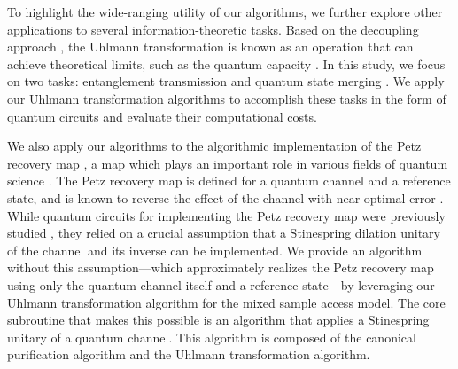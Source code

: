 To highlight the wide-ranging utility of our algorithms, we further explore other applications to several information-theoretic tasks. 
Based on the decoupling approach \cite{hayden2008decoupling, dupuis2010decoupling, Szehr2013decouple2design, dupuis2014one, preskill2016quantumshannon}, the Uhlmann transformation is known as an operation that can achieve theoretical limits, such as the quantum capacity \cite{hayden2008decoupling}.
In this study, we focus on two tasks: entanglement transmission \cite{Schumacher1996sendingentanglement, schumacher2001approximateerrorcorrection, hayden2007black, datta2013oneshotentassistQCcom, beigi2016decoding, khatri2024principlemodern} and quantum state merging \cite{Horodecki2005Partialquantinfo, berta2008singleshot, dupuis2014one, yamasaki2019statemergesmalldimension}.
We apply our Uhlmann transformation algorithms to accomplish these tasks in the form of quantum circuits and evaluate their computational costs.


We also apply our algorithms to the algorithmic implementation of the Petz recovery map \cite{petz1986sufficient, petz1988sufficiency}, a map which plays an important role in various fields of quantum science \cite{barnum2002reversing, ng2010simpleapproach, chen2020entanglement, lauten2022approx, gilyen2022petzmap, biswas2023noiseadapted, nakayama2023petz}.
The Petz recovery map is defined for a quantum channel and a reference state, and is known to reverse the effect of the channel with near-optimal error \cite{barnum2002reversing, beigi2016decoding}.
While quantum circuits for implementing the Petz recovery map were previously studied \cite{gilyen2022petzmap, biswas2023noiseadapted}, they relied on a crucial assumption that a Stinespring dilation unitary \cite{stinespring1955} of the channel and its inverse can be implemented. 
We provide an algorithm without this assumption---which approximately realizes the Petz recovery map using only the quantum channel itself and a reference state---by leveraging our Uhlmann transformation algorithm for the mixed sample access model.
The core subroutine that makes this possible is an algorithm that applies a Stinespring unitary of a quantum channel.
This algorithm is composed of the canonical purification algorithm and the Uhlmann transformation algorithm.




